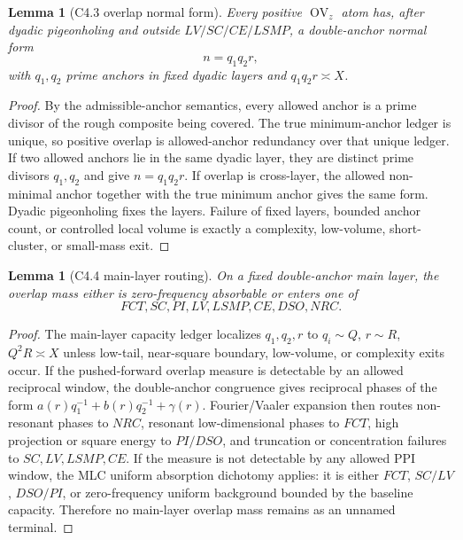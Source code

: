 \documentclass[11pt]{article}
\newtheorem{lemma}[theorem]{Lemma}
\theoremstyle{definition}
\newcommand{\OV}{\operatorname{OV}}
\begin{document}
\begin{lemma}[C4.3 overlap normal form]\label{lem:c4-overlap-normal}
Every positive $\OV_z$ atom has, after dyadic pigeonholing and outside $LV/SC/CE/LSMP$, a double-anchor normal form
\[
  n=q_1q_2r,
\]
with $q_1,q_2$ prime anchors in fixed dyadic layers and $q_1q_2r\asymp X$.
\end{lemma}
\begin{proof}
By the admissible-anchor semantics, every allowed anchor is a prime divisor of the rough composite being covered.  The true minimum-anchor ledger is unique, so positive overlap is allowed-anchor redundancy over that unique ledger.  If two allowed anchors lie in the same dyadic layer, they are distinct prime divisors $q_1,q_2$ and give $n=q_1q_2r$.  If overlap is cross-layer, the allowed non-minimal anchor together with the true minimum anchor gives the same form.  Dyadic pigeonholing fixes the layers.  Failure of fixed layers, bounded anchor count, or controlled local volume is exactly a complexity, low-volume, short-cluster, or small-mass exit.
\end{proof}

\begin{lemma}[C4.4 main-layer routing]\label{lem:c4-mainlayer}
On a fixed double-anchor main layer, the overlap mass either is zero-frequency absorbable or enters one of
\[
  FCT,SC,PI,LV,LSMP,CE,DSO,NRC.
\]
\end{lemma}
\begin{proof}
The main-layer capacity ledger localizes $q_1,q_2,r$ to $q_i\sim Q$, $r\sim R$, $Q^2R\asymp X$ unless low-tail, near-square boundary, low-volume, or complexity exits occur.  If the pushed-forward overlap measure is detectable by an allowed reciprocal window, the double-anchor congruence gives reciprocal phases of the form $a(r)q_1^{-1}+b(r)q_2^{-1}+\gamma(r)$.  Fourier/Vaaler expansion then routes non-resonant phases to $NRC$, resonant low-dimensional phases to $FCT$, high projection or square energy to $PI/DSO$, and truncation or concentration failures to $SC,LV,LSMP,CE$.  If the measure is not detectable by any allowed PPI window, the MLC uniform absorption dichotomy applies: it is either $FCT$, $SC/LV$, $DSO/PI$, or zero-frequency uniform background bounded by the baseline capacity.  Therefore no main-layer overlap mass remains as an unnamed terminal.
\end{proof}
\end{document}
